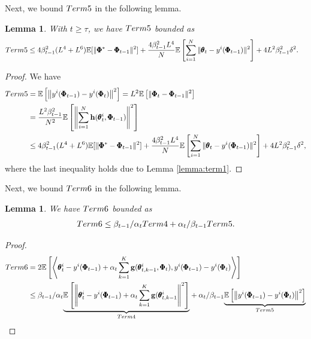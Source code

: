 \documentclass{article} %
\theoremstyle{plain}
\newtheorem{lemma}[theorem]{Lemma}
\theoremstyle{definition}
\theoremstyle{remark}
\begin{document}
{{Next, we bound $\textnormal{Term 5}$ in the following lemma.}

\begin{lemma}\label{lemma:Term5}
With $t\geq \tau$, we have $\textnormal{Term 5}$ bounded as
\begin{align}
    \textnormal{Term 5}
    &\leq 4\beta_{t-1}^2(L^4+L^6)\mathbb{E}[\|\pmb{\Phi}^*-\pmb{\Phi}_{t-1}\|^2]+\frac{4\beta_{t-1}^2L^4}{N}\mathbb{E}\left[\sum_{i=1}^N\|\pmb{\theta}_{t}-y^i(\pmb{\Phi}_{t-1})\|^2\right]+4L^2\beta_{t-1}^2\delta^2.
\end{align}
\end{lemma}

\begin{proof}
We have
\begin{align}
    \textnormal{Term 5}&=\mathbb{E}\left[\left\|y^i(\pmb{\Phi}_{t-1})-y^i(\pmb{\Phi}_{t})\right\|^2\right]=L^2\mathbb{E}\left[\|\pmb{\Phi}_t-\pmb{\Phi}_{t-1}\|^2\right]\nonumber\allowdisplaybreaks\\
    &=\frac{L^2\beta_{t-1}^2}{N^2}\mathbb{E}\left[\left\|\sum_{i=1}^N\bh(\pmb{\theta}_t^i, \pmb{\Phi}_{t-1})\right\|^2\right]\nonumber\allowdisplaybreaks\\
    &\leq 4\beta_{t-1}^2(L^4+L^6)\mathbb{E}[\|\pmb{\Phi}^*-\pmb{\Phi}_{t-1}\|^2]+\frac{4\beta_{t-1}^2L^4}{N}\mathbb{E}\left[\sum_{i=1}^N\|\pmb{\theta}_{t}-y^i(\pmb{\Phi}_{t-1})\|^2\right]+4L^2\beta_{t-1}^2\delta^2,
\end{align}
where the last inequality holds due to Lemma \ref{lemma:term1}.
\end{proof}


{Next, we bound $\textnormal{Term 6}$ in the following lemma.}
\begin{lemma}\label{lemma: Term6}
We have $\textnormal{Term 6}$ bounded as
\begin{align}
    \textnormal{Term 6}\leq \beta_{t-1}/\alpha_t \textnormal{Term 4}+ \alpha_t/\beta_{t-1} \textnormal{Term 5}.
\end{align}
\end{lemma}

\begin{proof}
\begin{align}
    \textnormal{Term 6}&=2\mathbb{E}\left[\left\langle\pmb{\theta}_{t}^i-y^i(\pmb{\Phi}_{t-1})+\alpha_t\sum_{k=1}^K\bg(\pmb{\theta}_{t,k-1}^i,\pmb{\Phi}_t),y^i(\pmb{\Phi}_{t-1})-y^i(\pmb{\Phi}_{t})\right\rangle\right]\nonumber\allowdisplaybreaks\\
    &\leq \beta_{t-1}/\alpha_t\underset{\textnormal{Term 4}}{\underbrace{\mathbb{E}\left[\left\|\pmb{\theta}_{t}^i-y^i(\pmb{\Phi}_{t-1})+\alpha_t\sum_{k=1}^K\bg(\pmb{\theta}_{t,k-1}^i\right\|^2\right]}}+\alpha_t/\beta_{t-1}\underset{\textnormal{Term 5}}{\underbrace{\mathbb{E}\left[\left\|y^i(\pmb{\Phi}_{t-1})-y^i(\pmb{\Phi}_{t})\right\|^2\right]}}
\end{align}
\end{proof}





}
\end{document}
